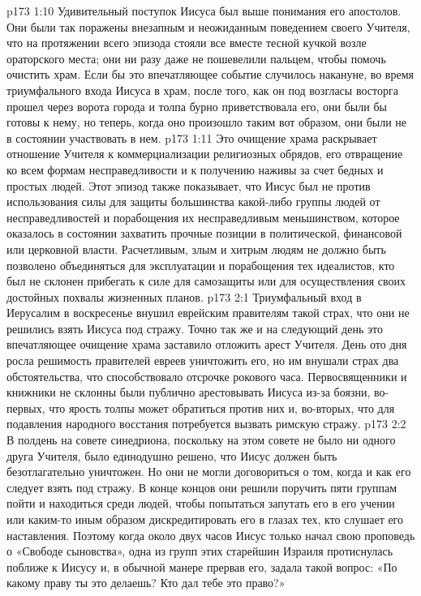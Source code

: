 \vs p173 1:10 Удивительный поступок Иисуса был выше понимания его апостолов. Они были так поражены внезапным и неожиданным поведением своего Учителя, что на протяжении всего эпизода стояли все вместе тесной кучкой возле ораторского места; они ни разу даже не пошевелили пальцем, чтобы помочь очистить храм. Если бы это впечатляющее событие случилось накануне, во время триумфального входа Иисуса в храм, после того, как он под возгласы восторга прошел через ворота города и толпа бурно приветствовала его, они были бы готовы к нему, но теперь, когда оно произошло таким вот образом, они были не в состоянии участвовать в нем.
\vs p173 1:11 Это очищение храма раскрывает отношение Учителя к коммерциализации религиозных обрядов, его отвращение ко всем формам несправедливости и к получению наживы за счет бедных и простых людей. Этот эпизод также показывает, что Иисус был не против использования силы для защиты большинства какой\hyp{}либо группы людей от несправедливостей и порабощения их несправедливым меньшинством, которое оказалось в состоянии захватить прочные позиции в политической, финансовой или церковной власти. Расчетливым, злым и хитрым людям не должно быть позволено объединяться для эксплуатации и порабощения тех идеалистов, кто был не склонен прибегать к силе для самозащиты или для осуществления своих достойных похвалы жизненных планов.
\vs p173 2:1 Триумфальный вход в Иерусалим в воскресенье внушил еврейским правителям такой страх, что они не решились взять Иисуса под стражу. Точно так же и на следующий день это впечатляющее очищение храма заставило отложить арест Учителя. День ото дня росла решимость правителей евреев уничтожить его, но им внушали страх два обстоятельства, что способствовало отсрочке рокового часа. Первосвященники и книжники не склонны были публично арестовывать Иисуса из\hyp{}за боязни, во\hyp{}первых, что ярость толпы может обратиться против них и, во\hyp{}вторых, что для подавления народного восстания потребуется вызвать римскую стражу.
\vs p173 2:2 В полдень на совете синедриона, поскольку на этом совете не было ни одного друга Учителя, было единодушно решено, что Иисус должен быть безотлагательно уничтожен. Но они не могли договориться о том, когда и как его следует взять под стражу. В конце концов они решили поручить пяти группам пойти и находиться среди людей, чтобы попытаться запутать его в его учении или каким\hyp{}то иным образом дискредитировать его в глазах тех, кто слушает его наставления. Поэтому когда около двух часов Иисус только начал свою проповедь о «Свободе сыновства», одна из групп этих старейшин Израиля протиснулась поближе к Иисусу и, в обычной манере прервав его, задала такой вопрос: «По какому праву ты это делаешь? Кто дал тебе это право?»
